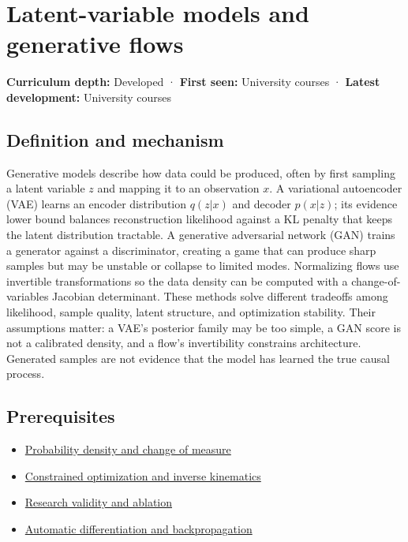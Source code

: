 \hypertarget{appendix-2c568f05ee34}{}\label{referencestart:appendix-2c568f05ee34}
\section{Latent-variable models and generative flows}\label{appendix-2c568f05ee34-latent-variable-models-and-generative-flows}

\textbf{Curriculum depth:} Developed · \textbf{First seen:} University courses · \textbf{Latest development:} University courses

\subsection{Definition and mechanism}\label{appendix-2c568f05ee34-definition-and-mechanism}

Generative models describe how data could be produced, often by first sampling a latent variable \(z\) and mapping it to an observation \(x\). A variational autoencoder (VAE) learns an encoder distribution \(q(z|x)\) and decoder \(p(x|z)\); its evidence lower bound balances reconstruction likelihood against a KL penalty that keeps the latent distribution tractable. A generative adversarial network (GAN) trains a generator against a discriminator, creating a game that can produce sharp samples but may be unstable or collapse to limited modes. Normalizing flows use invertible transformations so the data density can be computed with a change-of-variables Jacobian determinant. These methods solve different tradeoffs among likelihood, sample quality, latent structure, and optimization stability. Their assumptions matter: a VAE's posterior family may be too simple, a GAN score is not a calibrated density, and a flow's invertibility constrains architecture. Generated samples are not evidence that the model has learned the true causal process.

\subsection{Prerequisites}\label{appendix-2c568f05ee34-prerequisites}

\begin{itemize}
\tightlist
\item
  \hyperref[appendix-4815cd87ab8b]{Probability density and change of measure}
\item
  \hyperref[appendix-29f4bea4c2bb]{Constrained optimization and inverse kinematics}
\item
  \hyperref[appendix-65788587ef78]{Research validity and ablation}
\item
  \hyperref[appendix-40df0855b4a7]{Automatic differentiation and backpropagation}
\end{itemize}


